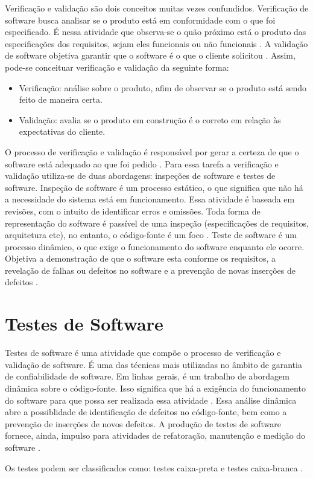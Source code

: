 \par
\indent Verificação e validação são dois conceitos muitas vezes confundidos. Verificação de software busca analisar se o produto está em conformidade com o que foi especificado. É nessa atividade que observa-se o quão próximo está o produto das especificações dos requisitos, sejam eles funcionais ou não funcionais \cite{sommerville_2007}. A validação de software objetiva garantir que o software é o que o cliente solicitou \cite{sommerville_2007}. Assim, pode-se conceituar verificação e validação da seguinte forma:
\begin{itemize}
\item Verificação: análise sobre o produto, afim de observar se o produto está sendo feito de maneira certa.
\item Validação: avalia se o produto em construção é o correto em relação às expectativas do cliente.
\end{itemize}
\par
\indent O processo de verificação e validação é responsável por gerar a certeza de que o software está adequado ao que foi pedido \cite{sommerville_2007}. Para essa tarefa a verificação e validação utiliza-se de duas abordagens: inspeções de software e testes de software. Inspeção de software é um processo estático, o que significa que não há a necessidade do sistema está em funcionamento. Essa atividade é baseada em revisões, com o intuito de identificar erros e omissões. Toda forma de representação do software é passível de uma inspeção (especificações de requisitos, arquitetura etc), no entanto, o código-fonte é um foco \cite{sommerville_2007}. Teste de software é um processo dinâmico, o que exige o funcionamento do software enquanto ele ocorre. Objetiva a demonstração de que o software esta conforme os requisitos, a revelação de falhas ou defeitos no software \cite{sommerville_2007} e a prevenção de novas inserções de defeitos \cite{burke_coyner_2003}.

\section{Testes de Software}
Testes de software é uma atividade que compõe o processo de verificação e validação de software. É uma das técnicas mais utilizadas no âmbito de garantia de confiabilidade de software. Em linhas gerais, é um trabalho de abordagem dinâmica sobre o código-fonte. Isso significa que há a exigência do funcionamento do software para que possa ser realizada essa atividade \cite{barbosa_et_al_2009}. Essa análise dinâmica abre a possiblidade de identificação de defeitos no código-fonte, bem como a prevenção de inserções de novos defeitos. A produção de testes de software fornece, ainda, impulso para atividades de refatoração, manutenção e medição do software \cite{barbosa_et_al_2009}.
\par
\indent Os testes podem ser classificados como: testes caixa-preta e testes caixa-branca \cite{barbosa_et_al_2009}.

